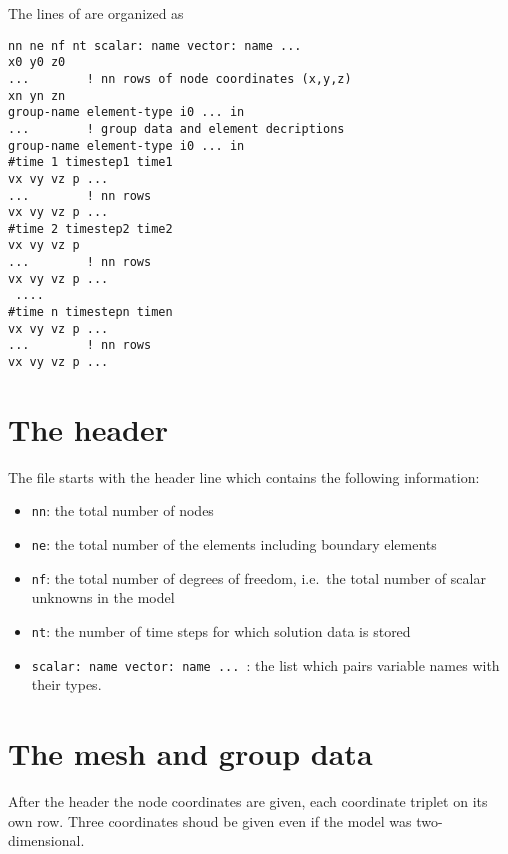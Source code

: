 \label{chapter-post-format}

The lines of  are organized as

\begin{verbatim}
nn ne nf nt scalar: name vector: name ...
x0 y0 z0
...        ! nn rows of node coordinates (x,y,z)
xn yn zn
group-name element-type i0 ... in
...        ! group data and element decriptions
group-name element-type i0 ... in
#time 1 timestep1 time1
vx vy vz p ...
...        ! nn rows 
vx vy vz p ...
#time 2 timestep2 time2
vx vy vz p
...        ! nn rows 
vx vy vz p ...
 ....
#time n timestepn timen
vx vy vz p ...
...        ! nn rows 
vx vy vz p ...
\end{verbatim}

\section*{The header}
The file starts with the header line which contains the 
following information:
\begin{itemize}
\item {\tt nn}: the total number of nodes
\item {\tt ne}: the total number of the elements including boundary elements
\item {\tt nf}: the total number of degrees of freedom, i.e.\ the total number of
scalar unknowns in the model
\item {\tt nt}: the number of time steps for which solution data is stored
\item {\tt scalar: name vector: name ... }: the list which pairs variable names with
their types.
\end{itemize}

\section*{The mesh and group data}

After the header the node coordinates are given, each coordinate triplet on its own row. 
Three coordinates shoud be given even if the model was two-dimensional.

